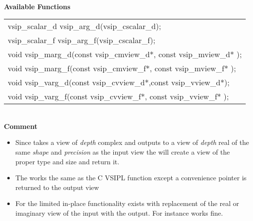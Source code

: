 \\\cvsiplh
\newline \hspace*{.8cm} \vspace*{.1cm} \textbf{Available Functions }
\newline \hspace*{1.1cm} {
\ttfamily
\begin{tabular}[H]{l}
vsip\_scalar\_d vsip\_arg\_d(vsip\_cscalar\_d);\\
vsip\_scalar\_f vsip\_arg\_f(vsip\_cscalar\_f);\\
void vsip\_marg\_d(const vsip\_cmview\_d*, const vsip\_mview\_d* );\\
void vsip\_marg\_f(const vsip\_cmview\_f*, const vsip\_mview\_f* );\\
void vsip\_varg\_d(const vsip\_cvview\_d*,const vsip\_vview\_d*);\\
void vsip\_varg\_f(const vsip\_cvview\_f*, const vsip\_vview\_f* );\\
\end{tabular}
}
\\\pyjvsiph
{}
\newline \hspace*{.8cm}\textbf{Comment}\\
\hspace*{.8cm}\parbox{11cm}{\vspace*{.2cm}
\begin{itemize}
\item{Since  takes a view of \emph{depth} complex and outputs to a view of \emph{depth} real of the same \emph{shape} and \emph{precision} as the input view the  \pyjvmethod will create a view of the proper type and size and return it.}
\item{The  \pyjvfunc works the same as the C VSIPL function except a convenience pointer is returned to the output view}
\item{For the \pyjvfunc limited in-place functionality exists with replacement of the real or imaginary view of the input with the output. For instance  works fine.}
\end{itemize}}
